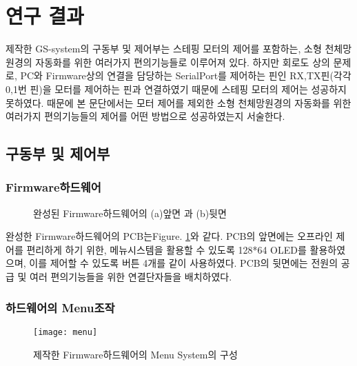 \section{연구 결과}
 제작한 GS-system의 구동부 및 제어부는 스테핑 모터의 제어를 포함하는, 소형 천체망원경의 자동화를 위한 여러가지 편의기능들로 이루어져 있다. 하지만 회로도 상의 문제로, PC와 Firmware상의 연결을 담당하는 SerialPort를 제어하는 핀인 RX,TX핀(각각 0,1번 핀)을 모터를 제어하는 핀과 연결하였기 때문에 스테핑 모터의 제어는 성공하지 못하였다. 때문에 본 문단에서는 모터 제어를 제외한 소형 천체망원경의 자동화를 위한 여러가지 편의기능들의 제어를 어떤 방법으로 성공하였는지 서술한다.

\subsection{구동부 및 제어부}

\subsubsection{Firmware하드웨어}

	\begin{figure}[ht]
	\begin{center}
	\end{center}
	\caption{완성된 Firmware하드웨어의 (a)앞면 과 (b)뒷면}
	\label{pcb}
	\end{figure}
	
	완성한 Firmware하드웨어의 PCB는\textrm{Figure}. \ref{pcb}와 같다. PCB의 앞면에는 오프라인 제어를 편리하게 하기 위한, 메뉴시스템을 활용할 수 있도록 128*64 OLED를 활용하였으며, 이를 제어할 수 있도록 버튼 4개를 같이 사용하였다. PCB의 뒷면에는 전원의 공급 및 여러 편의기능들을 위한 연결단자들을 배치하였다.
 
	
	
\subsubsection{하드웨어의 Menu조작}
 
  \begin{figure}[h]
 	\begin{center}
 		\texttt{[image: menu]}
 	\end{center}
 	\caption{제작한 Firmware하드웨어의 Menu System의 구성}
 	\label{menu}
 \end{figure}
 

